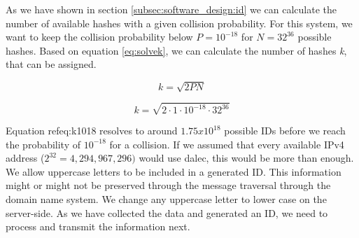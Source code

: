      As we have shown in section \ref{subsec:software_design:id} we can calculate the number of available hashes with a given collision probability. For this system, we want to keep the collision probability below $P = 10^{-18}$ for $N = 32^{36}$ possible hashes.
     Based on equation \ref{eq:solvek}, we can calculate the number of hashes \textit{k}, that can be assigned.
     
     \begin{equation*}
         k = \sqrt{2PN}
     \end{equation*}
     
     \begin{equation}
        \label{eq:k1018}
         k = \sqrt{2 \cdot 1 \cdot 10^{-18} \cdot 32^{36}}
     \end{equation}
     
     Equation ref{eq:k1018} resolves to around $1.75x10^{18}$ possible IDs before we reach the probability of $10^{-18}$ for a collision. If we assumed that every available IPv4 address ($2^{32} = 4,294,967,296)$ would use dalec, this would be more than enough.\\
     
     We allow uppercase letters to be included in a generated ID. This information might or might not be preserved through the message traversal through the domain name system. We change any uppercase letter to lower case on the server-side. 
     As we have collected the data and generated an ID, we need to process and transmit the information next.
     
     
% 
